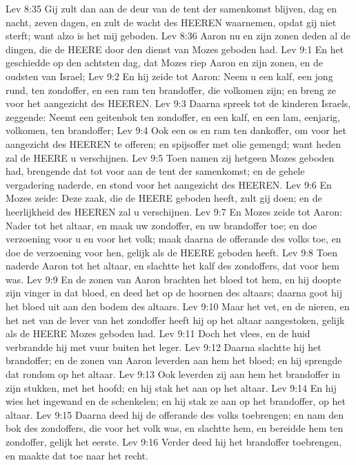 Lev 8:35  Gij zult dan aan de deur van de tent der samenkomst blijven, dag en nacht, zeven dagen, en zult de wacht des HEEREN waarnemen, opdat gij niet sterft; want alzo is het mij geboden.
Lev 8:36  Aaron nu en zijn zonen deden al de dingen, die de HEERE door den dienst van Mozes geboden had.
Lev 9:1  En het geschiedde op den achtsten dag, dat Mozes riep Aaron en zijn zonen, en de oudsten van Israel;
Lev 9:2  En hij zeide tot Aaron: Neem u een kalf, een jong rund, ten zondoffer, en een ram ten brandoffer, die volkomen zijn; en breng ze voor het aangezicht des HEEREN.
Lev 9:3  Daarna spreek tot de kinderen Israels, zeggende: Neemt een geitenbok ten zondoffer, en een kalf, en een lam, eenjarig, volkomen, ten brandoffer;
Lev 9:4  Ook een os en ram ten dankoffer, om voor het aangezicht des HEEREN te offeren; en spijsoffer met olie gemengd; want heden zal de HEERE u verschijnen.
Lev 9:5  Toen namen zij hetgeen Mozes geboden had, brengende dat tot voor aan de tent der samenkomst; en de gehele vergadering naderde, en stond voor het aangezicht des HEEREN.
Lev 9:6  En Mozes zeide: Deze zaak, die de HEERE geboden heeft, zult gij doen; en de heerlijkheid des HEEREN zal u verschijnen.
Lev 9:7  En Mozes zeide tot Aaron: Nader tot het altaar, en maak uw zondoffer, en uw brandoffer toe; en doe verzoening voor u en voor het volk; maak daarna de offerande des volks toe, en doe de verzoening voor hen, gelijk als de HEERE geboden heeft.
Lev 9:8  Toen naderde Aaron tot het altaar, en slachtte het kalf des zondoffers, dat voor hem was.
Lev 9:9  En de zonen van Aaron brachten het bloed tot hem, en hij doopte zijn vinger in dat bloed, en deed het op de hoornen des altaars; daarna goot hij het bloed uit aan den bodem des altaars.
Lev 9:10  Maar het vet, en de nieren, en het net van de lever van het zondoffer heeft hij op het altaar aangestoken, gelijk als de HEERE Mozes geboden had.
Lev 9:11  Doch het vlees, en de huid verbrandde hij met vuur buiten het leger.
Lev 9:12  Daarna slachtte hij het brandoffer; en de zonen van Aaron leverden aan hem het bloed; en hij sprengde dat rondom op het altaar.
Lev 9:13  Ook leverden zij aan hem het brandoffer in zijn stukken, met het hoofd; en hij stak het aan op het altaar.
Lev 9:14  En hij wies het ingewand en de schenkelen; en hij stak ze aan op het brandoffer, op het altaar.
Lev 9:15  Daarna deed hij de offerande des volks toebrengen; en nam den bok des zondoffers, die voor het volk was, en slachtte hem, en bereidde hem ten zondoffer, gelijk het eerste.
Lev 9:16  Verder deed hij het brandoffer toebrengen, en maakte dat toe naar het recht.
